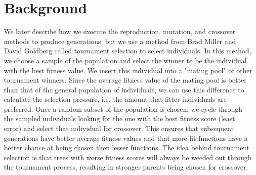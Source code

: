 
\section{Background}
\label{sec:background}



We later describe how we execute the reproduction, mutation, and crossover methods to produce generations, but we use a method from Brad Miller and David Goldberg \cite{tournamentselection} called tournament selection to select individuals. In this method, we choose a sample of the population and select the winner to be the individual with the best fitness value. We insert this individual into a "mating pool" of other tournament winners. Since the average fitness value of the mating pool is better than that of the general population of individuals, we can use this difference to calculate the selection pressure, i.e. the amount that fitter individuals are preferred. Once a random subset of the population is chosen, we cycle through the sampled individuals looking for the one with the best fitness score (least error) and select that individual for crossover. This ensures that subsequent generations have better average fitness values and that more fit functions have a better chance at being chosen then lesser functions. The idea behind tournament selection is that trees with worse fitness scores will always be weeded out through the tournament process, resulting in stronger parents being chosen for crossover.




